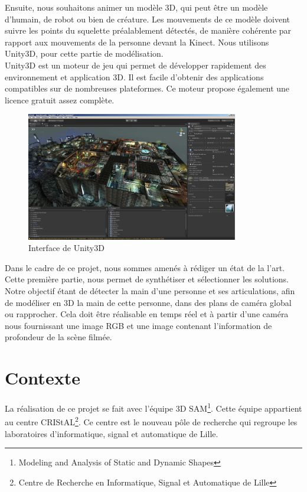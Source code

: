 Ensuite, nous souhaitons animer un modèle 3D, qui peut être un modèle 
d'humain, de robot ou bien de créature. Les mouvements de ce modèle 
doivent suivre les points du squelette préalablement détectés, de 
manière cohérente par rapport aux mouvements de la personne devant la 
Kinect. Nous utilisons Unity3D, pour cette partie de 
modélisation.\\

Unity3D est un moteur de jeu qui permet de développer rapidement des 
environnement et application 3D. Il est facile d'obtenir des 
applications compatibles sur de nombreuses plateformes. Ce moteur 
propose également une licence gratuit assez complète.\\

\begin{figure}[H]
  \begin{center}
    \includegraphics[width=350px]{images/Unity3D.jpg}
    \caption{Interface de Unity3D}
  \end{center}
\end{figure}

Dans le cadre de ce projet, nous sommes amenés à rédiger un état de la 
l'art. Cette première partie, nous permet de synthétiser et sélectionner 
les solutions. Notre objectif étant de détecter la main d'une personne et ses 
articulations, afin de modéliser en 3D la main 
de cette personne, dans des plans de caméra global ou rapprocher. Cela 
doit être réalisable en temps réel et à partir d'une caméra nous 
fournissant une image RGB et une image contenant l'information de 
profondeur de la scène filmée.\\

\section{Contexte}
La réalisation de ce projet se fait avec l'équipe 3D 
SAM\footnote{Modeling and Analysis of Static and Dynamic Shapes}. 
Cette équipe appartient au centre CRIStAL\footnote{Centre de Recherche 
en Informatique, Signal et Automatique de Lille}. Ce centre est le nouveau pôle de recherche qui regroupe les laboratoires d'informatique, signal et automatique de Lille.\\

